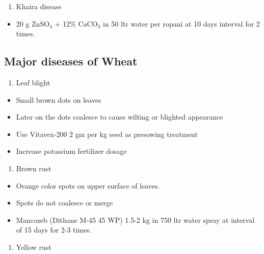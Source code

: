 \documentclass[
]{book}
\providecommand{\tightlist}{%
  \setlength{\itemsep}{0pt}\setlength{\parskip}{0pt}}
\begin{document}
\begin{enumerate}
\def\labelenumi{\arabic{enumi}.}
\setcounter{enumi}{5}
\tightlist
\item
  Khaira disease
\end{enumerate}

\begin{itemize}
\tightlist
\item
  20 g \(\mathrm{ZnSO_4}\) + 12\% \(\mathrm{CaCO_3}\) in 50 ltr water per ropani at 10 days interval for 2 times.
\end{itemize}

\hypertarget{major-diseases-of-wheat}{%
\subsection{Major diseases of Wheat}\label{major-diseases-of-wheat}}

\begin{enumerate}
\def\labelenumi{\arabic{enumi}.}
\tightlist
\item
  Leaf blight
\end{enumerate}

\begin{itemize}
\tightlist
\item
  Small brown dots on leaves
\item
  Later on the dots coalesce to cause wilting or blighted appearance
\item
  Use Vitavex-200 2 gm per kg seed as presowing treatment
\item
  Increase potassium fertilizer dosage
\end{itemize}

\begin{enumerate}
\def\labelenumi{\arabic{enumi}.}
\setcounter{enumi}{1}
\tightlist
\item
  Brown rust
\end{enumerate}

\begin{itemize}
\tightlist
\item
  Orange color spots on upper surface of leaves.
\item
  Spots do not coalesce or merge
\item
  Mancozeb (Dithane M-45 45 WP) 1.5-2 kg in 750 ltr water spray at interval of 15 days for 2-3 times.
\end{itemize}

\begin{enumerate}
\def\labelenumi{\arabic{enumi}.}
\setcounter{enumi}{2}
\tightlist
\item
  Yellow rust
\end{enumerate}
\end{document}
